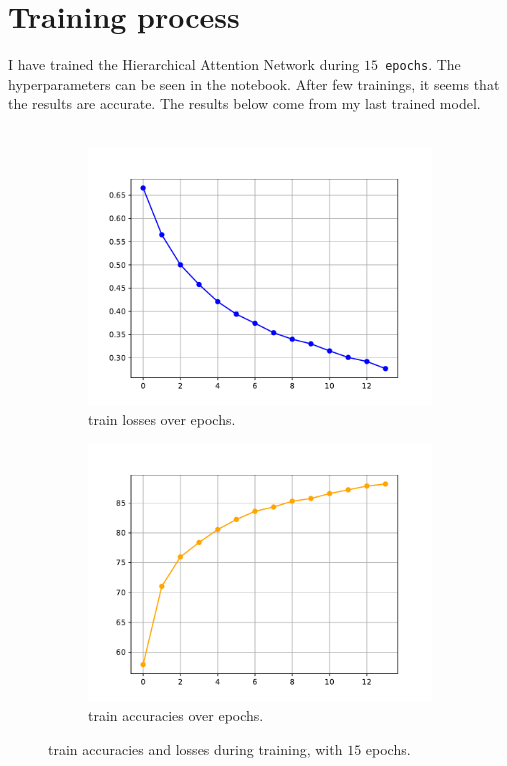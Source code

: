 \documentclass[a4paper]{article}
\begin{document}
\section*{Training process}
\noindent
I have trained the Hierarchical Attention Network during \texttt{$15$ epochs}.
The hyperparameters can be seen in the notebook. After few trainings, it seems that the
results are accurate. The results below come from my last trained model.
\\
\\
\noindent
\begin{figure}[H]
    \centering
    \begin{subfigure}[b]{0.45\textwidth}
        \centering
        \includegraphics[width=\textwidth]{../figures/train_loss.pdf}
        \caption{train losses over epochs.}
        \label{fig:image1}
    \end{subfigure}
    \hfill
    \begin{subfigure}[b]{0.45\textwidth}
        \centering
        \includegraphics[width=\textwidth]{../figures/train_accs.pdf}
        \caption{train accuracies over epochs.}
        \label{fig:image2}
    \end{subfigure}
    \caption{train accuracies and losses during training, with $15$ epochs.}
    \label{fig:images}
\end{figure}
\end{document}
